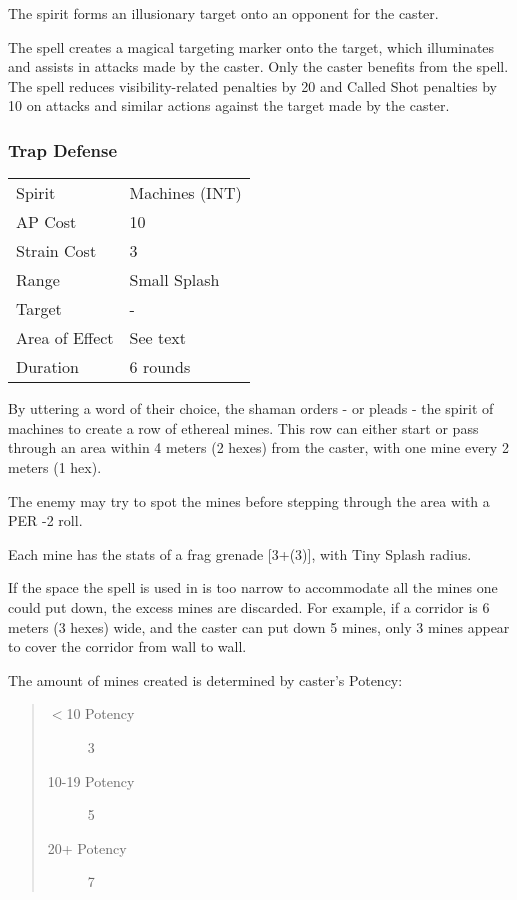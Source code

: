\documentclass[11pt,a4paper,twocolumn]{book}
\begin{document}
\medskip

The spirit forms an illusionary target onto an opponent for the caster.

The spell creates a magical targeting marker onto the target, which illuminates and assists in attacks made by the caster. Only the caster benefits from the spell. The spell reduces visibility-related penalties by 20 and Called Shot penalties by 10 on attacks and similar actions against the target made by the caster.

\subsubsection*{Trap Defense}
{
	\begin{tabu} to 70mm{| X[l,4] | X[l,7] |}
		\hline
		Spirit         & Machines (INT) \\
		AP Cost        & 10             \\
		Strain Cost    & 3              \\
		Range          & Small Splash   \\
		Target         & -              \\
		Area of Effect & See text       \\
		Duration       & 6 rounds       \\ \hline
	\end{tabu}
	
}
\smallskip

By uttering a word of their choice, the shaman orders - or pleads - the spirit of machines to create a row of ethereal mines. This row can either start or pass through an area within 4 meters (2 hexes) from the caster, with one mine every 2 meters (1 hex).

The enemy may try to spot the mines before stepping through the area with a PER -2 roll.

Each mine has the stats of a frag grenade [3+(3)], with Tiny Splash radius.

If the space the spell is used in is too narrow to accommodate all the mines one could put down, the excess mines are discarded. For example, if a corridor is 6 meters (3 hexes) wide, and the caster can put down 5 mines, only 3 mines appear to cover the corridor from wall to wall.

The amount of mines created is determined by caster's Potency:
\begin{quote}
	\begin{description}
		\item[$<$10 Potency] 	3
		\item[10-19 Potency] 	5
		\item[20+ Potency] 		7
	\end{description}	
\end{quote}
\end{document}
